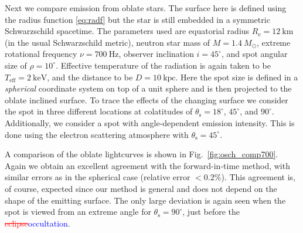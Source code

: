 \documentclass{aa}
\newcommand{\refe}[1]{\textcolor{blue}{{#1}}}
\newcommand{\refedel}[1]{\textcolor{red}{\sout{#1}}}
\newcommand{\sch}{Schwarzschild }
\newcommand{\Msun}{\ensuremath{M_{\odot}}}
\begin{document}
Next we compare emission from oblate stars.
The surface here is defined using the radius function \eqref{eq:radf} but the star is still embedded in a symmetric \sch spacetime.
The parameters used are equatorial radius $R_{\mathrm{e}} = 12~\mathrm{km}$ (in the usual \sch metric), neutron star mass of $M = 1.4~\Msun$, extreme rotational frequency $\nu = 700~\mathrm{Hz}$, observer inclination $i=45^{\circ}$, and spot angular size of $\rho = 10^{\circ}$.
Effective temperature of the radiation is again taken to be $T_{\mathrm{eff}} = 2~\mathrm{keV}$, and the distance to be $D = 10~\mathrm{kpc}$.
Here the spot size is defined in a \textit{spherical} coordinate system on top of a unit sphere and is then projected to the oblate inclined surface.
To trace the effects of the changing surface we consider the spot in three different locations at colatitudes of $\theta_{\mathrm{s}} = 18^{\circ}$, $45^{\circ}$, and $90^{\circ}$.
Additionally, we consider a spot with angle-dependent emission intensity.
This is done using the electron scattering atmosphere with $\theta_{\mathrm{s}} = 45^{\circ}$.

A comparison of the oblate lightcurves is shown in Fig.~\ref{fig:osch_comp700}.
Again we obtain an excellent agreement with the forward-in-time method, with similar errors as in the spherical case (relative error $< 0.2\%$).
This agreement is, of course, expected since our method is general and does not depend on the shape of the emitting surface.
The only large deviation is again seen when the spot is viewed from an extreme angle for $\theta_{\mathrm{s}} = 90^{\circ}$, just before the \refedel{eclipse}\refe{occultation}.

\end{document}
